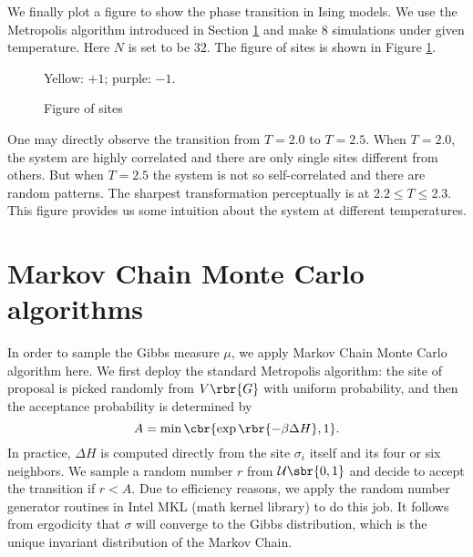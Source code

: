 \documentclass[english, nochinese]{pnote}
\begin{document}
We finally plot a figure to show the phase transition in Ising models. We use the Metropolis algorithm introduced in Section \ref{Sec:Alg} and make 8 simulations under given temperature. Here $N$ is set to be $32$. The figure of sites is shown in Figure \ref{Fig:Sites}.

\begin{figure}[htbp]
{
\centering
\scalebox{0.725}{}
\caption{Figure of sites}
\label{Fig:Sites}
}
{
\footnotesize Yellow: $+1$; purple: $-1$.
}
\end{figure}

One may directly observe the transition from $ T = 2.0 $ to $ T = 2.5 $. When $ T = 2.0 $, the system are highly correlated and there are only single sites different from others. But when $ T = 2.5 $ the system is not so self-correlated and there are random patterns. The sharpest transformation perceptually is at $ 2.2 \le T \le 2.3 $. This figure provides us some intuition about the system at different temperatures.

\section{Markov Chain Monte Carlo algorithms} \label{Sec:Alg}

In order to sample the Gibbs measure $\mu$, we apply Markov Chain Monte Carlo algorithm here. We first deploy the standard Metropolis algorithm: the site of proposal is picked randomly from $ V \rbr{G} $ with uniform probability, and then the acceptance probability is determined by
\begin{equation}
A = \min \cbr{ \exp \rbr{ -\beta \Delta H }, 1 }.
\end{equation}
In practice, $ \Delta H $ is computed directly from the site $\sigma_i$ itself and its four or six neighbors. We sample a random number $r$ from $ \mathcal{U} \sbr{ 0, 1 } $ and decide to accept the transition if $ r < A $. Due to efficiency reasons, we apply the random number generator routines in Intel MKL (math kernel library) to do this job. It follows from ergodicity that $\sigma$ will converge to the Gibbs distribution, which is the unique invariant distribution of the Markov Chain.
\end{document}
